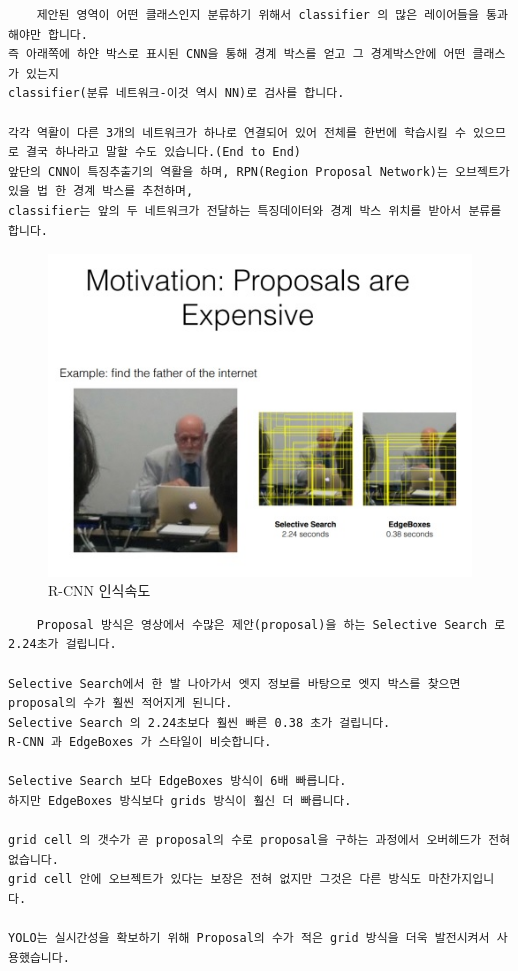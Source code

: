 \documentclass{article}
\begin{document}
\begin{verbatim}
    제안된 영역이 어떤 클래스인지 분류하기 위해서 classifier 의 많은 레이어들을 통과해야만 합니다.
즉 아래쪽에 하얀 박스로 표시된 CNN을 통해 경계 박스를 얻고 그 경계박스안에 어떤 클래스가 있는지
classifier(분류 네트워크-이것 역시 NN)로 검사를 합니다.

각각 역활이 다른 3개의 네트워크가 하나로 연결되어 있어 전체를 한번에 학습시킬 수 있으므로 결국 하나라고 말할 수도 있습니다.(End to End)
앞단의 CNN이 특징추출기의 역활을 하며, RPN(Region Proposal Network)는 오브젝트가 있을 법 한 경계 박스를 추천하며,
classifier는 앞의 두 네트워크가 전달하는 특징데이터와 경계 박스 위치를 받아서 분류를 합니다.

\end{verbatim}

\begin{figure}[h!]
\centering
\includegraphics[scale=3.0]{enhanceyolo1.jpg}
\caption{R-CNN 인식속도}
\label{fig:detect}
\end{figure}

\begin{verbatim}
    Proposal 방식은 영상에서 수많은 제안(proposal)을 하는 Selective Search 로 2.24초가 걸립니다.

Selective Search에서 한 발 나아가서 엣지 정보를 바탕으로 엣지 박스를 찾으면 proposal의 수가 훨씬 적어지게 된니다.
Selective Search 의 2.24초보다 훨씬 빠른 0.38 초가 걸립니다. 
R-CNN 과 EdgeBoxes 가 스타일이 비슷합니다.

Selective Search 보다 EdgeBoxes 방식이 6배 빠릅니다.
하지만 EdgeBoxes 방식보다 grids 방식이 훨신 더 빠릅니다.

grid cell 의 갯수가 곧 proposal의 수로 proposal을 구하는 과정에서 오버헤드가 전혀 없습니다.
grid cell 안에 오브젝트가 있다는 보장은 전혀 없지만 그것은 다른 방식도 마찬가지입니다.

YOLO는 실시간성을 확보하기 위해 Proposal의 수가 적은 grid 방식을 더욱 발전시켜서 사용했습니다.
\end{verbatim}
\end{document}
